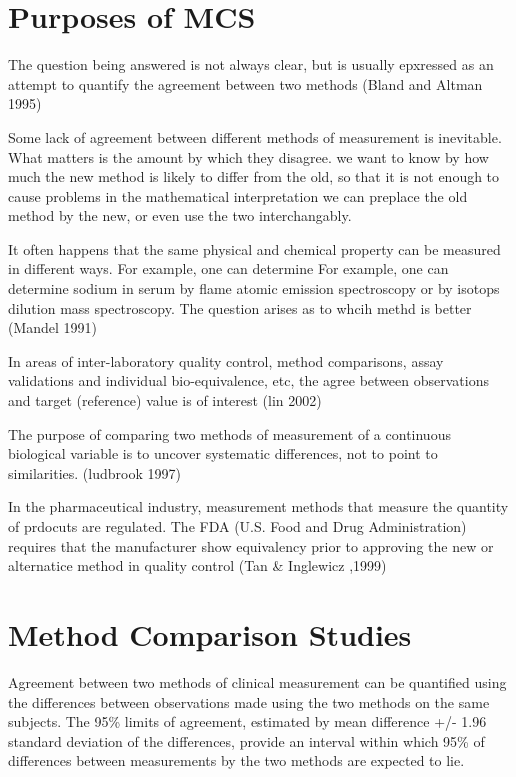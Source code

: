 \documentclass[12pt, a4paper]{report}
\theoremstyle{plain}
\theoremstyle{definition}
\theoremstyle{remark}
\begin{document}
	
	\section{Purposes of MCS}
	
	The  question being answered is not always clear, but is usually epxressed as an attempt to quantify the agreement
	between two methods (Bland and Altman 1995)
	
	Some lack of agreement between different methods of measurement is inevitable. What matters is the amount by which they
	disagree. we want to know by how much the new method is likely to differ from the old, so that it is not enough to cause
	problems in the mathematical interpretation we can preplace the old method by the new, or even use the two interchangably.
	
	
	It often happens that the same physical and chemical property can be measured in different ways. For example, one can determine
	For example, one can determine sodium in serum by flame atomic emission spectroscopy or by isotops dilution mass spectroscopy. The question arises as to whcih methd is better (Mandel 1991)
	
	In areas of inter-laboratory quality control, method comparisons, assay validations and individual bio-equivalence, etc, the agree between observations and target (reference) value is
	of interest (lin 2002)
	
	The purpose of comparing two methods of measurement of a continuous biological variable is to uncover systematic differences, not to point to
	similarities. (ludbrook 1997)
	
	In the pharmaceutical industry, measurement methods that measure the quantity of prdocuts are regulated. The FDA (U.S. Food and
	Drug Administration) requires that the manufacturer show equivalency prior to approving the new or alternatice method in quality control (Tan \& Inglewicz ,1999)
	
	\section{Method Comparison Studies}
	
	Agreement between two methods of clinical measurement can be quantified using the differences between observations made using the two methods on the same subjects. The 95\% limits of agreement, estimated by mean difference +/- 1.96 standard deviation of the differences, provide an interval within which 95\% of differences between measurements by the two methods are expected to lie.
	
\end{document}
